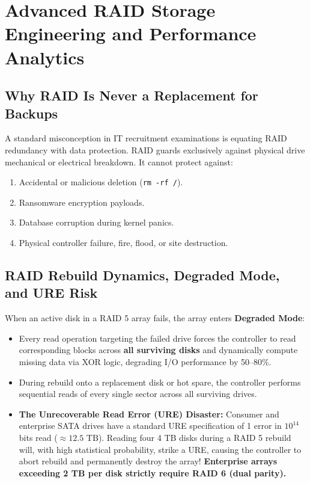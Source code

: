 \section{Advanced RAID Storage Engineering and Performance Analytics}
\label{sec:os_adv_raid}

\subsection{Why RAID Is Never a Replacement for Backups}
A standard misconception in IT recruitment examinations is equating RAID redundancy with data protection. RAID guards exclusively against physical drive mechanical or electrical breakdown. It cannot protect against:
\begin{enumerate}
    \item Accidental or malicious deletion (\texttt{rm -rf /}).
    \item Ransomware encryption payloads.
    \item Database corruption during kernel panics.
    \item Physical controller failure, fire, flood, or site destruction.
\end{enumerate}

\subsection{RAID Rebuild Dynamics, Degraded Mode, and URE Risk}
When an active disk in a RAID 5 array fails, the array enters \textbf{Degraded Mode}:
\begin{itemize}
    \item Every read operation targeting the failed drive forces the controller to read corresponding blocks across \textbf{all surviving disks} and dynamically compute missing data via XOR logic, degrading I/O performance by 50--80\%.
    \item During rebuild onto a replacement disk or hot spare, the controller performs sequential reads of every single sector across all surviving drives.
    \item \textbf{The Unrecoverable Read Error (URE) Disaster:} Consumer and enterprise SATA drives have a standard URE specification of 1 error in $10^{14}$ bits read ($\approx 12.5\text{ TB}$). Reading four 4 TB disks during a RAID 5 rebuild will, with high statistical probability, strike a URE, causing the controller to abort rebuild and permanently destroy the array! \textbf{Enterprise arrays exceeding 2 TB per disk strictly require RAID 6 (dual parity).}
\end{itemize}

